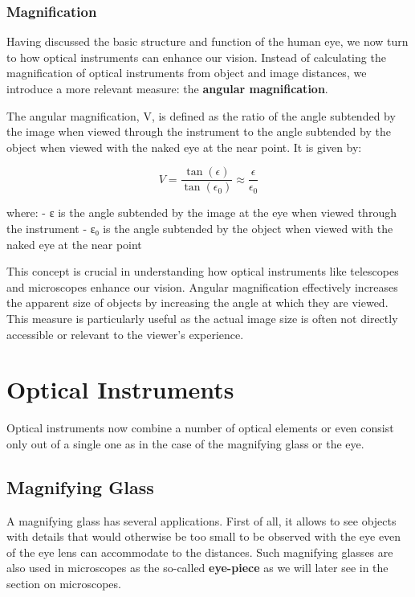 \documentclass[
  a4paper,
]{book}
\begin{document}
\subsection{Magnification}\label{magnification}

Having discussed the basic structure and function of the human eye, we
now turn to how optical instruments can enhance our vision. Instead of
calculating the magnification of optical instruments from object and
image distances, we introduce a more relevant measure: the
\textbf{angular magnification}.

The angular magnification, V, is defined as the ratio of the angle
subtended by the image when viewed through the instrument to the angle
subtended by the object when viewed with the naked eye at the near
point. It is given by:

\[
V=\frac{\tan(\epsilon)}{\tan(\epsilon_0)}\approx \frac{\epsilon}{\epsilon_0}
\]

where: - ε is the angle subtended by the image at the eye when viewed
through the instrument - ε₀ is the angle subtended by the object when
viewed with the naked eye at the near point

This concept is crucial in understanding how optical instruments like
telescopes and microscopes enhance our vision. Angular magnification
effectively increases the apparent size of objects by increasing the
angle at which they are viewed. This measure is particularly useful as
the actual image size is often not directly accessible or relevant to
the viewer's experience.

\chapter{Optical Instruments}\label{optical-instruments-1}

Optical instruments now combine a number of optical elements or even
consist only out of a single one as in the case of the magnifying glass
or the eye.

\section{Magnifying Glass}\label{magnifying-glass}

A magnifying glass has several applications. First of all, it allows to
see objects with details that would otherwise be too small to be
observed with the eye even of the eye lens can accommodate to the
distances. Such magnifying glasses are also used in microscopes as the
so-called \textbf{eye-piece} as we will later see in the section on
microscopes.
\end{document}
